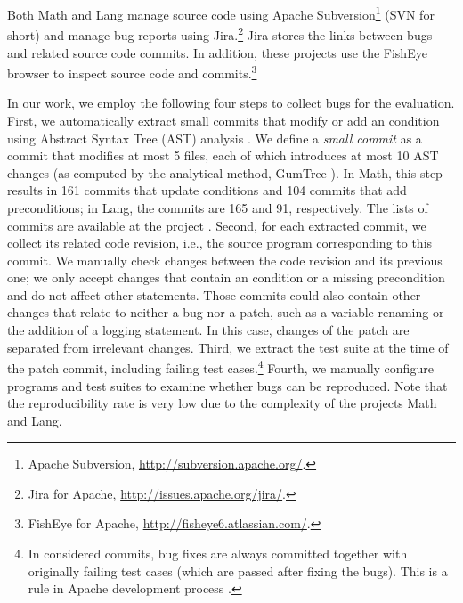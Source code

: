 Both Math and Lang manage source code using Apache Subversion\footnote{Apache Subversion, \url{http://subversion.apache.org/}.} (SVN for short) and manage bug reports using Jira.\footnote{Jira for Apache, \url{http://issues.apache.org/jira/}.} Jira stores the links between bugs and related source code commits. In addition, these projects use the FishEye browser to inspect source code and commits.\footnote{FishEye for Apache, \url{http://fisheye6.atlassian.com/}.} 

In our work, we employ the following four steps to collect bugs for the evaluation. 
First, we automatically extract small commits that modify or add an \ourif condition using Abstract Syntax Tree (AST) analysis \cite{Falleri2014}.
We define a \textit{small commit} as a commit that modifies at most 5 files, each of which introduces at most 10 AST changes (as computed by the analytical method, GumTree \cite{Falleri2014}).
In Math, this step results in 161 commits that update \ourif conditions and 104 commits that add preconditions; in Lang, the commits are 165 and 91, respectively. The lists of commits are available at the \nopol project \cite{nopol2014}.
Second, for each extracted commit, we collect its related code revision, i.e., the source program corresponding to this commit. 
We manually check changes between the code revision and its previous one; we only accept changes that contain an \ourif condition or a missing precondition and do not affect other statements. Those commits could also contain other changes that relate to neither a bug nor a patch, such as a variable renaming or the addition of a logging statement. 
In this case, changes of the patch are separated from irrelevant changes. 
Third, we extract the test suite at the time of the patch commit, including failing test cases.\footnote{In considered commits, bug fixes are always committed together with originally failing test cases (which are passed after fixing the bugs). This is a rule in Apache development process \cite{apache2014}.} 
Fourth, we manually configure programs and test suites to examine whether bugs can be reproduced. 
Note that the reproducibility rate is very low due to the complexity of the projects Math and Lang. 

